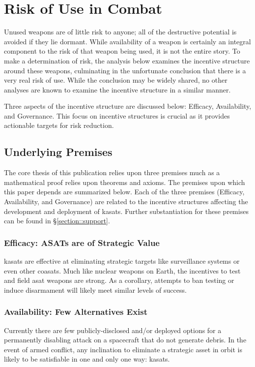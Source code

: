 \section{Risk of Use in Combat}

Unused weapons are of little risk to anyone; all of the destructive
potential is avoided if they lie dormant.  While availability of a
weapon is certainly an integral component to the risk of that weapon
being used, it is not the entire story.  To make a determination of
risk, the analysis below examines the incentive structure around these
weapons, culminating in the unfortunate conclusion that there is a
very real risk of use.  While the conclusion may be widely shared, no
other analyses are known to examine the incentive structure in a
similar manner.

Three aspects of the incentive structure are discussed below:
Efficacy, Availability, and Governance.  This focus on incentive
structures is crucial as it provides actionable targets for risk
reduction.


\subsection{Underlying Premises}

The core thesis of this publication relies upon three premises much as
a mathematical proof relies upon theorems and axioms.  The premises
upon which this paper depends are summarized below.  Each of the three
premises (Efficacy, Availability, and Governance) are related to the
incentive structures affecting the development and deployment of
\acp{kasat}.  Further substantiation for these premises can be found
in \S\ref{section::support}.

\subsubsection{Efficacy: ASATs are of Strategic Value}
\acp{kasat} are effective at eliminating strategic targets like
surveillance systems or even other \acp{coasat}.  Much like nuclear
weapons on Earth, the incentives to test and field \ac{asat} weapons
are strong.  As a corollary, attempts to ban testing or induce
disarmament will likely meet similar levels of success.

\subsubsection{Availability: Few Alternatives Exist}
Currently there are few publicly-disclosed and/or deployed options for
a permanently disabling attack on a spacecraft that do not generate
debris.  In the event of armed conflict, any inclination to eliminate
a strategic asset in orbit is likely to be satisfiable in one and only
one way: \acp{kasat}.

